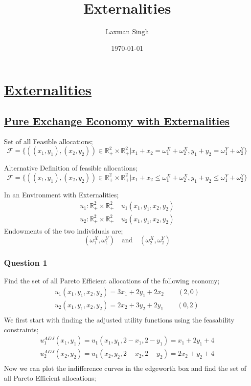 \documentclass[12pt,a4paper]{article}
\author{Laxman Singh}
\date{\today}
\title{Externalities}
\begin{document}
 \section*{\underline{Externalities}}
 \subsection*{\underline{Pure Exchange Economy with Externalities}}  
 Set of all Feasible allocations;
 \begin{equation*}
     \mathcal{F}= \{\left( (x_{1},y_{1}),(x_{2},y_{2}) \right) \in \mathbb{R}^2_{+} \times \mathbb{R}^2_{+} | x_{1}+x_{2}=\omega_{1}^X + \omega^X_{2} , y_{1}+y_{2}= \omega^Y_{1}+\omega^Y_{2} \}
 \end{equation*}  
 
 Alternative Definition of feasible allocations;
 \begin{equation*}
    \mathcal{F}= \{\left( (x_{1},y_{1}) , (x_{2},y_{2}) \right) \in \mathbb{R}^2_{+} \times \mathbb{R}^2_{+} | x_{1}+x_{2}\leq \omega_{1}^X + \omega^X_{2} , y_{1}+y_{2}\leq \omega^Y_{1}+\omega^Y_{2}\}
 \end{equation*}
  
 In an Environment with Externalities;
 \begin{equation*}
    \begin{split}
        u_{1}: \mathbb{R}^2_{+} \times \mathbb{R}^2_{+} \quad u_{1}(x_{1},y_{1},x_{2},y_{2})\\
        u_{2}: \mathbb{R}^2_{+} \times \mathbb{R}^2_{+} \quad u_{2}(x_{1},y_{1},x_{2},y_{2})  
    \end{split}
    \end{equation*}
Endowments of the two individuals are;
\begin{equation*}
    \left( \omega_{1}^X, \omega_{1}^Y \right) \quad \text{and} \quad \left( \omega_{2}^X , \omega_{2}^Y \right)  
\end{equation*} 
\subsubsection*{Question 1}
Find the set of all Pareto Efficient allocations of the following economy;
   \begin{align*}
       u_{1}(x_{1},y_{1},x_{2},y_{2})= 3x_{1}+2y_{1}+2x_{2} \qquad (2,0) \\
       u_{2}(x_{1},y_{1},x_{2},y_{2})= 2x_{2}+3y_{2}+2y_{1} \qquad (0,2)\\
   \end{align*}
   We first start with finding the adjusted utility functions using the feasability constraints;
  \begin{align*}
    u_{1}^{ADJ}(x_{1},y_{1})=u_{1}(x_{1},y_{1},2-x_{1},2-y_{1})= x_{1}+2y_{1}+4\\
    u_{2}^{ADJ}(x_{2},y_{2})=u_{1}(x_{2},y_{2},2-x_{2},2-y_{2})= 2x_{2}+y_{2}+4\\
  \end{align*}
  Now we can plot the indifference curves in the edgeworth box and find the set of all Pareto Efficient allocations;
  
\end{document}
